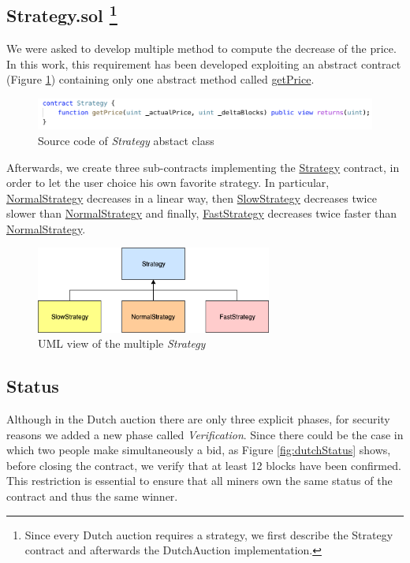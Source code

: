\documentclass[runningheads,a4paper]{llncs}
\begin{document}
\newpage
\subsection{Strategy.sol \protect\footnote{Since every Dutch auction requires a strategy, we first describe the Strategy contract and afterwards the DutchAuction implementation.}}

We were asked to develop multiple method to compute the decrease of the price. In this work, this requirement has been developed exploiting an abstract contract (Figure \ref{fig:strategycode}) containing only one abstract method called \url{getPrice}.

\begin{figure}[h]
\includegraphics[width=\linewidth]{images/strategycode.png}
\centering
\caption{Source code of \emph{Strategy} abstact class}
\label{fig:strategycode}
\end{figure}

Afterwards, we create three sub-contracts implementing the \url{Strategy} contract, in order to let the user choice his own favorite strategy. In particular, \url{NormalStrategy} decreases in a linear way, then \url{SlowStrategy} decreases twice slower than \url{NormalStrategy} and finally, \url{FastStrategy} decreases twice faster than \url{NormalStrategy}.

\begin{figure}[h]
\includegraphics[width=220pt]{images/strategyUML.png}
\centering
\caption{UML view of the multiple \emph{Strategy}}
\label{fig:strategyUML}
\end{figure}

\newpage
\subsection{Status} \label{status}
Although in the Dutch auction there are only three explicit phases, for security reasons we added a new phase called \emph{Verification}. Since there could be the case in which two people make simultaneously a bid, as Figure \ref{fig:dutchStatus} shows, before closing the contract, we verify that at least 12 blocks \cite{ethBlog} have been confirmed. This restriction is essential to ensure that all miners own the same status of the contract and thus the same winner.
\end{document}
